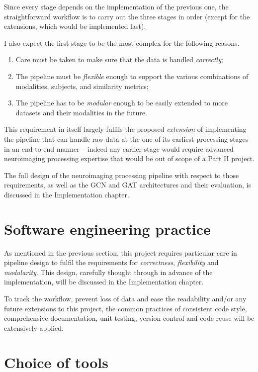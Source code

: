 Since every stage depends on the implementation of the previous one, the straightforward workflow is to carry out the three stages in order (except for the extensions, which would be implemented last). 

I also expect the first stage to be the most complex for the following reasons.
\begin{enumerate}
    \item Care must be taken to make sure that the data is handled \textit{correctly};
    \item The pipeline must be \textit{flexible} enough to support the various combinations of modalities, subjects, and similarity metrics;
    \item The pipeline has to be \textit{modular} enough to be easily extended to more datasets and their modalities in the future.
\end{enumerate} 

This requirement in itself largely fulfils the proposed \textit{extension} of implementing the pipeline that can handle raw data at the one of its earliest processing stages in an end-to-end manner – indeed any earlier stage would require advanced neuroimaging processing expertise that would be out of scope of a Part II project. 

The full design of the neuroimaging processing pipeline with respect to those requirements, as well as the GCN and GAT architectures and their evaluation, is discussed in the Implementation chapter.

\section{Software engineering practice}

As mentioned in the previous section, this project requires particular care in pipeline design to fulfil the requirements for \textit{correctness}, \textit{flexibility} and \textit{modularity}. This design, carefully thought through in advance of the implementation, will be discussed in the Implementation chapter.

To track the workflow, prevent loss of data and ease the readability and/or any future extensions to this project, the common practices of consistent code style, comprehensive documentation, unit testing, version control and code reuse will be extensively applied.

\section{Choice of tools}

